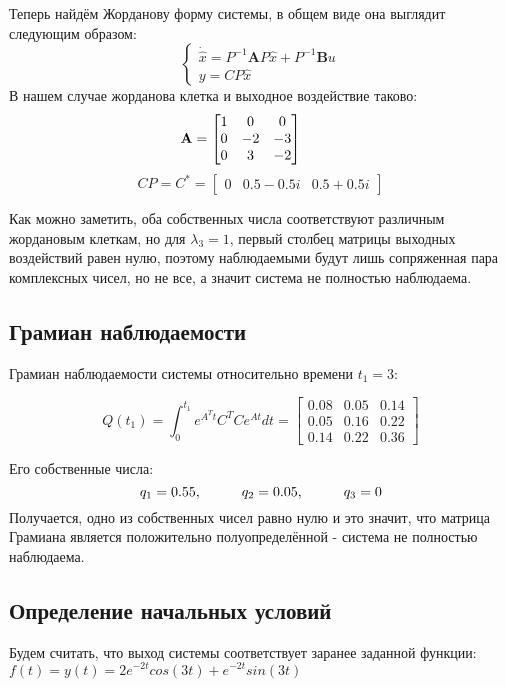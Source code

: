 Теперь найдём Жорданову форму системы, в общем виде она выглядит следующим образом:
$$
    \begin{cases}
      \dot{\hat{x}} = P^{-1}\boldsymbol{A}P \hat{x} + P^{-1}\boldsymbol{B} u \\
      y = CP\hat{x}
    \end{cases}
$$
В нашем случае жорданова клетка и выходное воздействие таково:
$$
    \mathbf{A} = \begin{bmatrix}
        1 & 0 & 0 \\
        0 & -2 & -3 \\
        0 & 3 & -2 
        \end{bmatrix} \hspace*{1cm} 
$$
$$
CP = C^* = \begin{bmatrix}
    0 & 0.5-0.5i & 0.5+0.5i 
    \end{bmatrix}
$$

Как можно заметить, оба собственных числа соответствуют различным жордановым клеткам, но для $\lambda_3=1$,
первый столбец матрицы выходных воздействий равен нулю, 
поэтому наблюдаемыми будут лишь сопряженная пара комплексных чисел, но не все, а значит система не полностью наблюдаема.

\subsection{Грамиан наблюдаемости}

Грамиан наблюдаемости системы относительно времени $t_1 = 3$:

$$
Q(t_1) = \int_{0}^{t_1}e^{A^Tt}C^TCe^{At}dt = 
    \begin{bmatrix}
        0.08 & 0.05 & 0.14 \\
        0.05 & 0.16 & 0.22 \\
        0.14 & 0.22  & 0.36
    \end{bmatrix}
$$

Его собственные числа:
$$
    q_{1} = 0.55 , \hspace*{1cm} q_{2} = 0.05, \hspace*{1cm} q_3 = 0
$$
Получается, одно из собственных чисел равно нулю и это значит, что матрица Грамиана является положительно полуопределённой
- система  не полностью наблюдаема.

\newpage
\subsection{Определение начальных условий}

Будем считать, что выход системы соответствует заранее заданной функции: $f(t) = y(t) = 2e^{-2t}cos(3t) + e^{-2t}sin(3t)$

